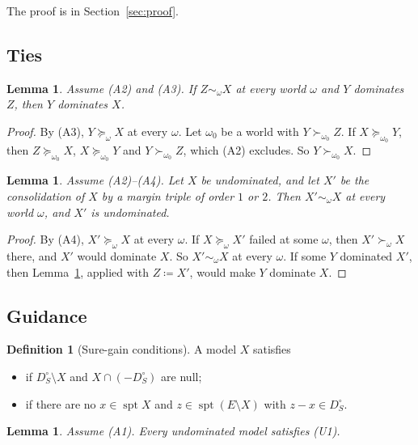 \documentclass[11pt]{article}
\DeclareMathOperator{\spt}{spt}
\theoremstyle{plain}
\newtheorem{lemma}[theorem]{Lemma}
\theoremstyle{definition}
\newtheorem{definition}[theorem]{Definition}
\begin{document}
The proof is in Section~\ref{sec:proof}.

\subsection{Ties}

\begin{lemma}\label{lem:tie}
Assume (A2) and (A3). If $Z\sim_\omega X$ at every world $\omega$ and $Y$ dominates $Z$, then
$Y$ dominates $X$.
\end{lemma}

\begin{proof}
By (A3), $Y\succeq_\omega X$ at every $\omega$. Let $\omega_0$ be a world with
$Y\succ_{\omega_0}Z$. If $X\succeq_{\omega_0}Y$, then $Z\succeq_{\omega_0}X$,
$X\succeq_{\omega_0}Y$ and $Y\succ_{\omega_0}Z$, which (A2) excludes. So $Y\succ_{\omega_0}X$.
\end{proof}

\begin{lemma}\label{lem:constie}
Assume (A2)--(A4). Let $X$ be undominated, and let $X'$ be the consolidation of $X$ by a margin
triple of order $1$ or $2$. Then $X'\sim_\omega X$ at every world $\omega$, and $X'$ is
undominated.
\end{lemma}

\begin{proof}
By (A4), $X'\succeq_\omega X$ at every $\omega$. If $X\succeq_\omega X'$ failed at some
$\omega$, then $X'\succ_\omega X$ there, and $X'$ would dominate $X$. So $X'\sim_\omega X$ at
every $\omega$. If some $Y$ dominated $X'$, then Lemma~\ref{lem:tie}, applied with $Z\coloneqq
X'$, would make $Y$ dominate $X$.
\end{proof}

\subsection{Guidance}

\begin{definition}[Sure-gain conditions]\label{def:U}
A model $X$ satisfies
\begin{itemize}
  \item[(U1)] if $D_S^\circ\setminus X$ and $X\cap(-D_S^\circ)$ are null;
  \item[(U2)] if there are no $x\in\spt X$ and $z\in\spt(E\setminus X)$ with $z-x\in D_S^\circ$.
\end{itemize}
\end{definition}

\begin{lemma}\label{lem:U1}
Assume (A1). Every undominated model satisfies (U1).
\end{lemma}
\end{document}
